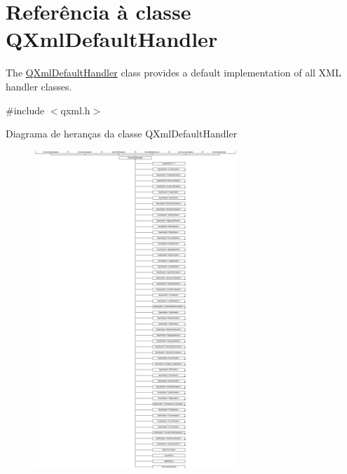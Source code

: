 \hypertarget{class_q_xml_default_handler}{\section{Referência à classe Q\-Xml\-Default\-Handler}
\label{class_q_xml_default_handler}
}


The \hyperlink{class_q_xml_default_handler}{Q\-Xml\-Default\-Handler} class provides a default implementation of all X\-M\-L handler classes.  




{\ttfamily \#include $<$qxml.\-h$>$}

Diagrama de heranças da classe Q\-Xml\-Default\-Handler\begin{figure}[H]
\begin{center}
\leavevmode
\includegraphics[height=12.000000cm]{class_q_xml_default_handler}
\end{center}
\end{figure}
